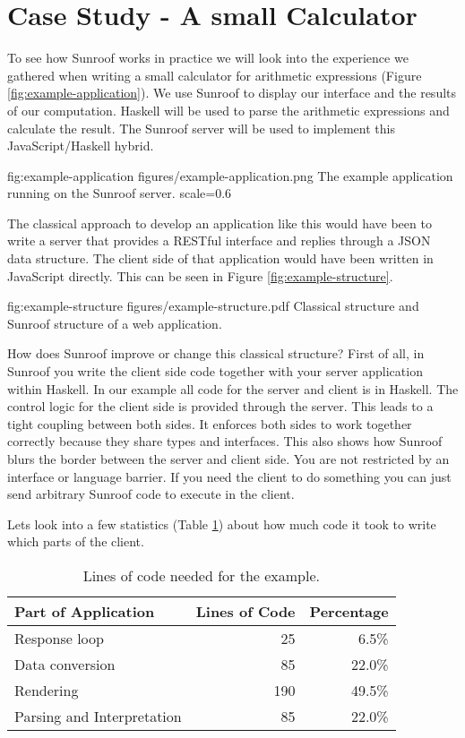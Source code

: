  
\section{Case Study - A small Calculator}
\label{sec:extended-example}

To see how Sunroof works in practice we will look into the 
experience we gathered when writing a small calculator
for arithmetic expressions (Figure \ref{fig:example-application}). 
We use Sunroof to display our interface
and the results of our computation. Haskell will be used to parse the 
arithmetic expressions and calculate the result. The Sunroof server 
will be used to implement this JavaScript/Haskell hybrid.

\FigureS%
{fig:example-application}%
{figures/example-application.png}%
{The example application running on the Sunroof server.}%
{scale=0.6}

The classical approach to develop an application like this would have 
been to write a server that provides a RESTful interface and replies 
through a JSON data structure. 
The client side of that application would have been written in JavaScript
directly.
This can be seen in Figure \ref{fig:example-structure}.

\Figure%
{fig:example-structure}%
{figures/example-structure.pdf}%
{Classical structure and Sunroof structure of a web application.}

How does Sunroof improve or change this classical structure?
First of all, in Sunroof you write the client side code together with
your server application within Haskell. In our example all code 
for the server and client is in Haskell. The control logic 
for the client side is provided through the server.
This leads to a tight coupling between both sides. 
It enforces both sides to work together
correctly because they share types and interfaces. 
This also shows how Sunroof blurs the border between the server 
and client side. You are not restricted by an interface or language 
barrier. If you need the client to do something you can just 
send arbitrary Sunroof code to execute in the client.

Lets look into a few statistics (Table \ref{tab:example-statistics}) 
about how much code it took to write which parts of the client.

\begin{table}
\begin{center}
\begin{tabular}{l@{\quad}r@{\quad}r}
\hline\rule{0pt}{12pt}%
Part of Application & Lines of Code & Percentage \\[2pt]
\hline\rule{0pt}{12pt}%
Response loop & 25 & 6.5\% \\[2pt]
Data conversion & 85 & 22.0\% \\[2pt]
Rendering & 190 & 49.5\% \\[2pt]
Parsing and Interpretation & 85 & 22.0\% \\[2pt]
\hline
\end{tabular}
\end{center}
\caption{Lines of code needed for the example.}
\label{tab:example-statistics}
\end{table} 

